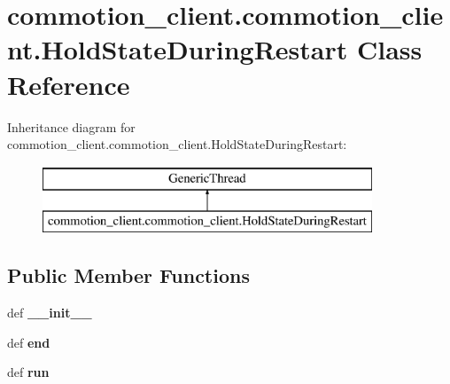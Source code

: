 \hypertarget{classcommotion__client_1_1commotion__client_1_1HoldStateDuringRestart}{\section{commotion\-\_\-client.\-commotion\-\_\-client.\-Hold\-State\-During\-Restart Class Reference}
\label{classcommotion__client_1_1commotion__client_1_1HoldStateDuringRestart}
}
Inheritance diagram for commotion\-\_\-client.\-commotion\-\_\-client.\-Hold\-State\-During\-Restart\-:\begin{figure}[H]
\begin{center}
\leavevmode
\includegraphics[height=2.000000cm]{classcommotion__client_1_1commotion__client_1_1HoldStateDuringRestart}
\end{center}
\end{figure}
\subsection*{Public Member Functions}
\begin{DoxyCompactItemize}
\item 
\hypertarget{classcommotion__client_1_1commotion__client_1_1HoldStateDuringRestart_a94f6059b8470ee3a2307bdc2d08935a4}{def {\bfseries \-\_\-\-\_\-init\-\_\-\-\_\-}}\label{classcommotion__client_1_1commotion__client_1_1HoldStateDuringRestart_a94f6059b8470ee3a2307bdc2d08935a4}

\item 
\hypertarget{classcommotion__client_1_1commotion__client_1_1HoldStateDuringRestart_a8f5151ef8eaea8fbdaa3d52005556ad2}{def {\bfseries end}}\label{classcommotion__client_1_1commotion__client_1_1HoldStateDuringRestart_a8f5151ef8eaea8fbdaa3d52005556ad2}

\item 
\hypertarget{classcommotion__client_1_1commotion__client_1_1HoldStateDuringRestart_a4385fc3adbd39cb53ad032166fac2aef}{def {\bfseries run}}\label{classcommotion__client_1_1commotion__client_1_1HoldStateDuringRestart_a4385fc3adbd39cb53ad032166fac2aef}

\end{DoxyCompactItemize}
